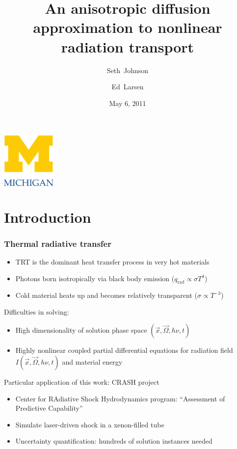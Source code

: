 \documentclass{beamer}
\title[ORNL Seminar]%
{An anisotropic diffusion approximation to nonlinear radiation transport}
\author[SRJ, EWL]{Seth~Johnson \and Ed~Larsen}
\institute[UMich]{
University of Michigan, Ann Arbor
}
\date[5/6/2011]{May 6, 2011}
\begin{document}

\begin{frame}
\titlepage
\begin{center}
  \includegraphics[width=0.2\textwidth]{../figures/umlogo}
\end{center}
\end{frame}

\section{Introduction}
\begin{frame}
  \frametitle{Thermal radiative transfer}
  \begin{itemize}
    \item TRT is the dominant heat transfer process in very hot materials
    \item Photons born isotropically via black body emission
      ($q_\text{rad} \propto \sigma T^4$)
    \item Cold material heats up and becomes relatively transparent
      ($\sigma\propto T^{-3}$)
  \end{itemize}

  Difficulties in solving:
  \begin{itemize}
    \item High dimensionality of solution phase space $(\vec{x}, \vec{\Omega},
      h\nu, t)$
    \item Highly nonlinear coupled partial differential equations for radiation
      field $I(\vec{x}, \vec{\Omega}, h\nu, t)$ and material energy
  \end{itemize}

  Particular application of this work: CRASH project
  \begin{itemize}
    \item Center for RAdiative Shock Hydrodynamics program: ``Assessment
      of Predictive Capability''
    \item Simulate laser-driven shock in a xenon-filled tube
    \item Uncertainty quantification: hundreds of solution instances needed
  \end{itemize}
\end{frame}
\end{document}

